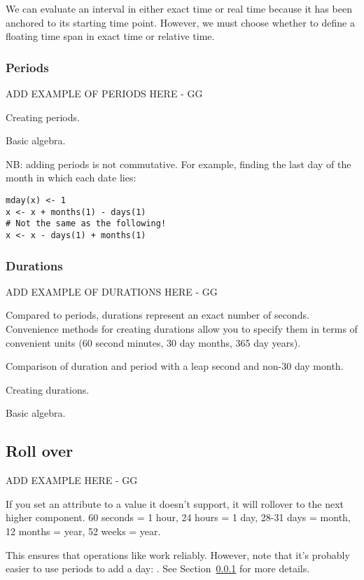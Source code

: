 \documentclass[article]{jss}
\begin{document}
We can evaluate an interval in either exact time or real time because it has been anchored to its starting time point. However, we must choose whether to define a floating time span in exact time or relative time.



\subsubsection{Periods}
\label{sec:periods}

ADD EXAMPLE OF PERIODS HERE - GG

Creating periods.  

Basic algebra.

NB: adding periods is not commutative. For example, finding the last day of the month in which each date lies:

\begin{verbatim}
mday(x) <- 1
x <- x + months(1) - days(1)
# Not the same as the following!
x <- x - days(1) + months(1) 
\end{verbatim}


\subsubsection{Durations}
\label{sec:durations}

ADD EXAMPLE OF DURATIONS HERE - GG

Compared to periods, durations represent an exact number of seconds.  Convenience methods for creating durations allow you to specify them in terms of convenient units (60 second minutes, 30 day months, 365 day years).  

Comparison of duration and period with a leap second and non-30 day month.

Creating durations.

Basic algebra.


\subsection{Roll over}

ADD EXAMPLE HERE - GG

If you set an attribute to a value it doesn't support, it will rollover to the next higher component.  60 seconds = 1 hour, 24 hours = 1 day, 28-31 days = month, 12 months = year, 52 weeks = year.  

This ensures that operations like  work reliably.  However, note that it's probably easier to use periods to add a day: .  See Section~\ref{sec:periods} for more details.
\end{document}
